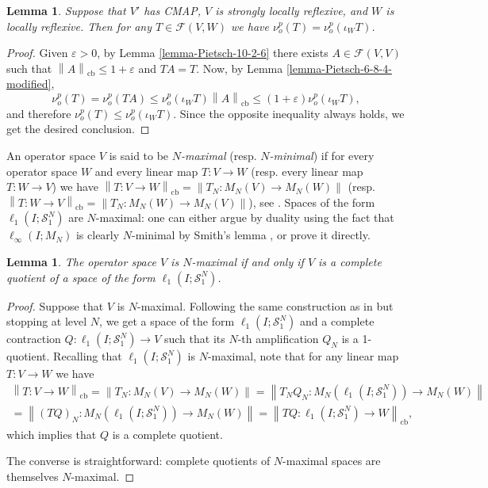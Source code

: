 \documentclass[11pt]{amsart}
\DeclareMathOperator{\cb}{cb}
\newcommand{\n}[1]{ \left\|#1\right\| }
\newtheorem{lemma}[theorem]{Lemma}
\numberwithin{equation}{section}
\begin{document}
\begin{lemma}\label{lemma-Pietsch-10-3-1-modified}
Suppose that $V'$ has CMAP, $V$ is strongly locally reflexive, and $W$ is locally reflexive.
Then for any $T \in \mathcal{F}(V,W)$ we have $\nu^{p}_o(T) = \nu^p_o(\iota_WT)$.
\end{lemma}

\begin{proof}
Given $\varepsilon>0$, by Lemma \ref{lemma-Pietsch-10-2-6} there exists $A \in \mathcal{F}(V,V)$   such that $\n{A}_{\cb} \le 1+\varepsilon$ and $TA =T$.
Now, by Lemma \ref{lemma-Pietsch-6-8-4-modified},
\[
\nu^{p}_o(T) = \nu^{p}_o(TA) \le \nu^p_o(\iota_W T) \n{A}_{\cb} \le (1+\varepsilon) \nu^p_o(\iota_W T),
\]
and therefore $\nu^{p}_o(T) \le \nu^p_o(\iota_W T)$.
Since the opposite inequality always holds, we get the desired conclusion.
\end{proof}

An operator space $V$ is said to be \emph{$N$-maximal} (resp. \emph{$N$-minimal}) if for every operator space $W$ and every linear map $T : V \to W$ (resp. every linear map $T : W \to V$) we have $\n{T : V \to W}_{\cb} = \n{T_N : M_N(V) \to M_N(W)}$ (resp. $\n{T : W \to V}_{\cb} = \n{T_N : M_N(W) \to M_N(V)}$),
see \cite{OikhbergRicard2004MathAnn, LehnerPhDThesis}.
Spaces of the form $\ell_1(I; \mathcal{S}_1^N)$ are $N$-maximal: one can either argue by duality \cite[Lem. 2.4]{OikhbergRicard2004MathAnn} using the fact that $\ell_\infty(I; M_N)$ is clearly $N$-minimal by Smith's lemma \cite[Prop. 1.12]{Pisier-OS-theory}, or prove it directly.



\begin{lemma}\label{lemma-N-maximal-is-quotient-of-ell_1({S}_1^N)}
The operator space $V$ is $N$-maximal if and only if $V$ is a complete quotient of a space of the form $\ell_1(I;\mathcal{S}_1^N)$.  
\end{lemma}

\begin{proof}
Suppose that $V$ is $N$-maximal. Following the same construction as in \cite[Prop. 2.1.2.2]{Pisier-OS-theory} but stopping at level $N$, we get a space of the form $\ell_1(I;\mathcal{S}_1^N)$ and a complete contraction $Q : \ell_1(I;\mathcal{S}_1^N) \to V$ such that its $N$-th amplification $Q_N$ is a 1-quotient.
Recalling that $\ell_1(I;\mathcal{S}_1^N)$ is $N$-maximal, note that for any linear map $T : V \to W$ we have
\begin{multline*}
\n{T : V \to W}_{\cb} = \n{T_N : M_N(V) \to M_N(W)} = \n{T_N Q_N : M_N(\ell_1(I;\mathcal{S}_1^N)) \to M_N(W)}\\
= \n{(TQ)_N : M_N(\ell_1(I;\mathcal{S}_1^N)) \to M_N(W)}
= \n{TQ : \ell_1(I;\mathcal{S}_1^N) \to W}_{\cb},
\end{multline*}
which implies that $Q$ is a complete quotient.

The converse is straightforward: complete quotients of $N$-maximal spaces are themselves $N$-maximal.
\end{proof}
\end{document}
